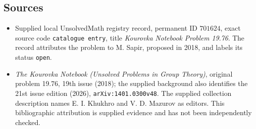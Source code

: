 \documentclass[11pt]{article}
\begin{document}
\subsection{Sources}
\begin{itemize}
\item Supplied local UnsolvedMath registry record, permanent ID \(701624\), exact source code \texttt{catalogue entry}, title \emph{Kourovka Notebook Problem 19.76}. The record attributes the problem to M. Sapir, proposed in 2018, and labels its status \texttt{open}.
\item \emph{The Kourovka Notebook (Unsolved Problems in Group Theory)}, original problem 19.76, 19th issue (2018); the supplied background also identifies the 21st issue edition (2026), \texttt{arXiv:1401.0300v48}. The supplied collection description names E. I. Khukhro and V. D. Mazurov as editors. This bibliographic attribution is supplied evidence and has not been independently checked.
\end{itemize}
\end{document}
